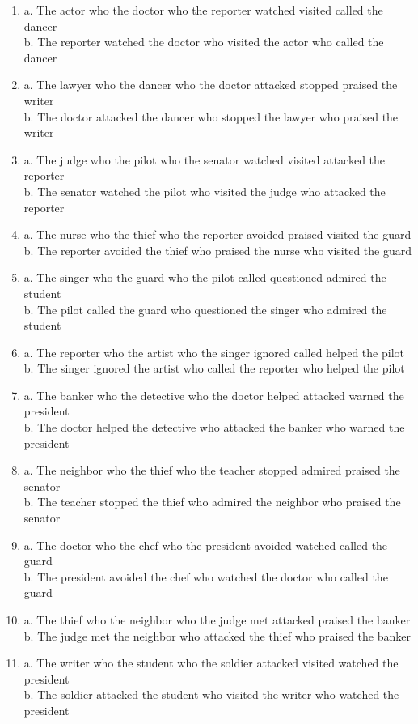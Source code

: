 \documentclass[11pt]{article}
\begin{document}
\begin{enumerate}[label={(\arabic*)}, nosep]
  \small
  \item a. The actor who the doctor who the reporter watched visited called the dancer \\ b. The reporter watched the doctor who visited the actor who called the dancer
  \item a. The lawyer who the dancer who the doctor attacked stopped praised the writer \\ b. The doctor attacked the dancer who stopped the lawyer who praised the writer
  \item a. The judge who the pilot who the senator watched visited attacked the reporter \\ b. The senator watched the pilot who visited the judge who attacked the reporter
  \item a. The nurse who the thief who the reporter avoided praised visited the guard \\ b. The reporter avoided the thief who praised the nurse who visited the guard
  \item a. The singer who the guard who the pilot called questioned admired the student \\ b. The pilot called the guard who questioned the singer who admired the student
  \item a. The reporter who the artist who the singer ignored called helped the pilot \\ b. The singer ignored the artist who called the reporter who helped the pilot
  \item a. The banker who the detective who the doctor helped attacked warned the president \\ b. The doctor helped the detective who attacked the banker who warned the president
  \item a. The neighbor who the thief who the teacher stopped admired praised the senator \\ b. The teacher stopped the thief who admired the neighbor who praised the senator
  \item a. The doctor who the chef who the president avoided watched called the guard \\ b. The president avoided the chef who watched the doctor who called the guard
  \item a. The thief who the neighbor who the judge met attacked praised the banker \\ b. The judge met the neighbor who attacked the thief who praised the banker
  \item a. The writer who the student who the soldier attacked visited watched the president \\ b. The soldier attacked the student who visited the writer who watched the president

\end{enumerate}
\end{document}
